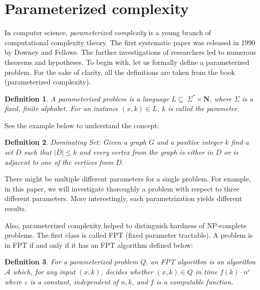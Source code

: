 \documentclass[en]{pracamgr}
\newtheorem{definition}{Definition}
\newcommand{\domsetp}{{\sc Dominating Set}}
\begin{document}
\section{Parameterized complexity}

In computer science, \emph{parameterized complexity} is a young branch of computational complexity theory. The first systematic paper was released in 1990 by Downey and Fellows. The further investigations of researchers led to numerous theorems and hypotheses. To begin with, let us formally define a parameterized problem. For the sake of clarity, all the definitions are taken from the book (parameterized complexity).


\begin{definition}\label{Parameterized problem}
	A {\textup{parameterized problem}} is a language $L \subseteq \ \Sigma^* \times \mathbf{N}$, where $\Sigma$ is a fixed, finite alphabet. For an instance $(x,k) \in L$, $k$ is called the \textup{parameter}.
\end{definition}

See the example below to understand the concept:

\begin{definition}
	\domsetp{}: Given a graph $G$ and a positive integer $k$ find a set $D$ such that $|D| \leq k$ and every vertex from the graph is either in $D$ or is adjacent to one of the vertices from $D$.
\end{definition}

There might be multiple different parameters for a single problem. For example, in this paper, we will investigate thoroughly a problem with respect to three different parameters. More interestingly, each parametrization yields different results. 

Also, parameterized complexity helped to distinguish hardness of NP-complete problems. The first class is called FPT (fixed parameter tractable). A problem is in FPT if and only if it has an FPT algorithm defined below:

\begin{definition}\label{FPT algorithm}
	For a parameterized problem $Q$, an \textup{FPT algorithm} is an algorithm $\mathcal{A}$ which, for any input $(x,k)$, decides whether $(x,k) \in Q$ in time $f(k)\cdot n^c$ where c is a constant, independent of $n,k$, and $f$ is a computable function.
\end{definition}
\end{document}
